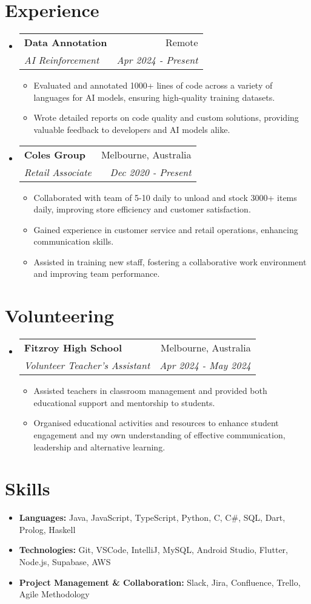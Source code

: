 \documentclass[letterpaper,11pt]{article}
\makeatletter
\newcommand{\resumeItem}[1]{
  \item\small{
    {#1 \vspace{-2pt}}
  }
}
\newcommand{\resumeSubheading}[4]{
  \vspace{-1pt}\item
    \begin{tabular*}{0.97\textwidth}{l@{\extracolsep{\fill}}r}
      \textbf{#1} & #2 \\
      \textit{\small#3} & \textit{\small #4} \\
    \end{tabular*}\vspace{-5pt}
}
\newcommand{\resumeSubHeadingListStart}{\begin{itemize}[leftmargin=*]}
\newcommand{\resumeSubHeadingListEnd}{\end{itemize}}
\newcommand{\resumeItemListStart}{\begin{itemize}}
\newcommand{\resumeItemListEnd}{\end{itemize}\vspace{-5pt}}
\makeatother
\begin{document}
\section{Experience}
\resumeSubHeadingListStart

\resumeSubheading
{Data Annotation}{Remote}
{AI Reinforcement}{Apr 2024 - Present}
\resumeItemListStart
\resumeItem{}{Evaluated and annotated 1000+ lines of code across a variety of languages for AI models, ensuring high-quality training datasets.}
\resumeItem{}{Wrote detailed reports on code quality and custom solutions, providing valuable feedback to developers and AI models alike.}
\resumeItemListEnd

\resumeSubheading
{Coles Group}{Melbourne, Australia}
{Retail Associate}{Dec 2020 - Present}
\resumeItemListStart
\resumeItem{}{Collaborated with team of 5-10 daily to unload and stock 3000+ items daily, improving store efficiency and customer satisfaction.}
\resumeItem{}{Gained experience in customer service and retail operations, enhancing communication skills.}
\resumeItem{}{Assisted in training new staff, fostering a collaborative work environment and improving team performance.}
\resumeItemListEnd
\resumeSubHeadingListEnd

\section{Volunteering}
\resumeSubHeadingListStart

\resumeSubheading
{Fitzroy High School}{Melbourne, Australia}
{Volunteer Teacher's Assistant}{Apr 2024 - May 2024}
\resumeItemListStart
\resumeItem{}{Assisted teachers in classroom management and provided both educational support and mentorship to students.}
\resumeItem{}{Organised educational activities and resources to enhance student engagement and my own understanding of effective communication, leadership and alternative learning.}
\resumeItemListEnd

\resumeSubHeadingListEnd

%
\section{Skills}
\resumeSubHeadingListStart
\item{\textbf{Languages:} Java, JavaScript, TypeScript, Python, C, C\#, SQL, Dart, Prolog, Haskell}
\item{\textbf{Technologies:} Git, VSCode, IntelliJ, MySQL, Android Studio, Flutter, Node.js, Supabase, AWS}
\item{\textbf{Project Management \& Collaboration:} Slack, Jira, Confluence, Trello, Agile Methodology}
\resumeSubHeadingListEnd

\end{document}

